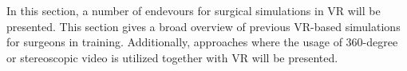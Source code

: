 In this section, a number of endevours for surgical simulations in VR will be presented.
This section gives a broad overview of previous VR-based simulations for surgeons in training.
Additionally, approaches where the usage of 360-degree or stereoscopic video is utilized together with VR will be presented.
